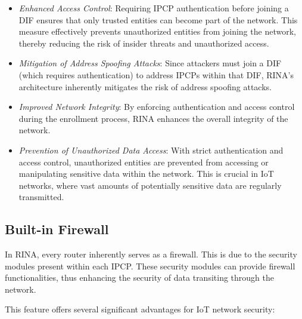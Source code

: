 \documentclass{ieeeaccess}
\begin{document}
\begin{itemize}
	\item \textit{Enhanced Access Control}: Requiring IPCP authentication before joining a DIF ensures that only trusted entities can become part of the network. This measure effectively prevents unauthorized entities from joining the network, thereby reducing the risk of insider threats and unauthorized access.
	\item \textit{Mitigation of Address Spoofing Attacks}: Since attackers must join a DIF (which requires authentication) to address IPCPs within that DIF, RINA's architecture inherently mitigates the risk of address spoofing attacks. 
	\item \textit{Improved Network Integrity}: By enforcing authentication and access control during the enrollment process, RINA enhances the overall integrity of the network.
	\item \textit{Prevention of Unauthorized Data Access}: With strict authentication and access control, unauthorized entities are prevented from accessing or manipulating sensitive data within the network. This is crucial in IoT networks, where vast amounts of potentially sensitive data are regularly transmitted.
\end{itemize}

\subsection{Built-in Firewall}
In RINA, every router inherently serves as a firewall. This is due to the security modules present within each IPCP. These security modules can provide firewall functionalities, thus enhancing the security of data transiting through the network.

This feature offers several significant advantages for IoT network security:
\end{document}
